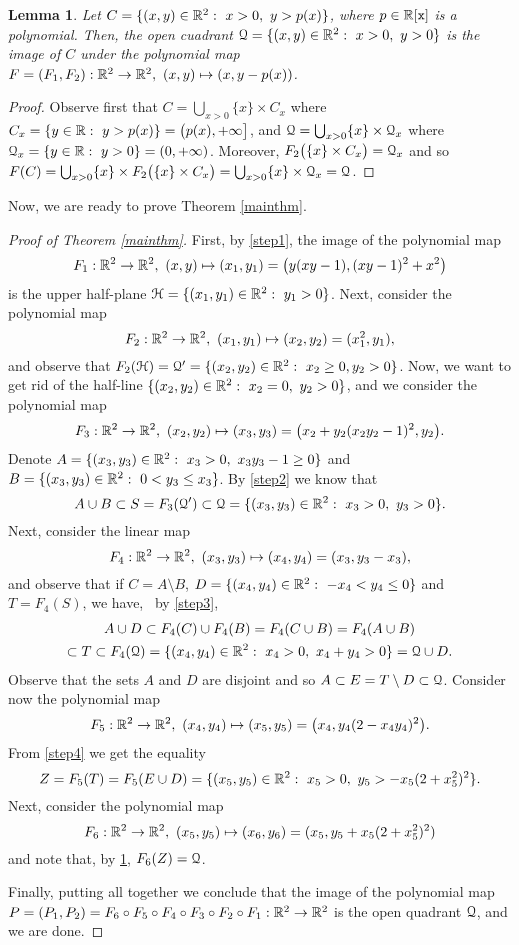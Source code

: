 \documentclass[11pt,a4paper]{amsart}
\newtheorem{lem}[theor]{Lemma}
\theoremstyle{definition}
\theoremstyle{remark}
\newcommand{\Qq}{{\EuScript Q}}
\newcommand{\halfplane}{{\EuScript H}}
\newcommand{\x}{{\tt x}} \newcommand{\y}{{\tt y}}
\begin{document}
\begin{lem}\label{step5}
Let $C=\{(x,y)\in{\mathbb R}^2:\ x>0, \ y>p(x)\}$, where $p\in\R[\x]$ is a polynomial. Then, the open cuadrant $\Qq=\{(x,y)\in\R^2:\ x>0, \ y>0\}$ is the image of $C$ under the polynomial map $F=(F_1,F_2):\R^2\to\R^2,\ (x,y)\mapsto(x,y-p(x))$.
\end{lem}
\begin{proof}
Observe first that $C=\bigcup_{x>0}\{x\}\times C_x$ where $C_x=\{y\in\R:\ y>p(x)\}=\big(p(x),+\infty\big]$, and $\Qq=\bigcup_{x>0}\{x\}\times\Qq_x$ where $\Qq_x=\{y\in\R:\ y>0\}=(0,+\infty)$. Moreover, $F_2\big(\{x\}\times C_x\big)=\Qq_x$ and so $F(C)=\bigcup_{x>0}\{x\}\times F_2\big(\{x\}\times C_x\big)=\bigcup_{x>0}\{x\}\times \Qq_x=\Qq$.
\end{proof}

Now, we are ready to prove Theorem \ref{mainthm}.

\begin{proof}[Proof of Theorem \em\ref{mainthm}]
First, by \ref{step1}, the image of the polynomial map 
$$
F_1:\R^2\to\R^2,\ (x,y)\mapsto(x_1,y_1)=\big(y(xy-1),(xy-1)^2+x^2\big)
$$ 
is the upper half-plane $\halfplane=\{(x_1,y_1)\in\R^2:\ y_1>0\}$. Next, consider the polynomial map 
$$
F_2:\R^2\to\R^2,\ (x_1,y_1)\mapsto(x_2,y_2)=(x_1^2,y_1),
$$ 
and observe that $F_2(\halfplane)=\Qq'=\{(x_2,y_2)\in\R^2:\ x_2\geq0,y_2>0\}$. Now, we want to get rid of the half-line $\{(x_2,y_2)\in\R^2:\ x_2=0,\ y_2>0\}$, and we consider the polynomial map 
$$
F_3:\R^2\to\R^2,\ (x_2,y_2)\mapsto(x_3,y_3)=\big(x_2+y_2(x_2y_2-1)^2,y_2\big).
$$
Denote $A=\{(x_3,y_3)\in\R^2:\ x_3>0,\ x_3y_3-1\geq0\}$ and $B=\{(x_3,y_3)\in{\mathbb R}^2:\ 0<y_3\leq x_3\}$. By \ref{step2} we know that 
$$
A\cup B\subset S=F_3(\Qq')\subset \Qq=\{(x_3,y_3)\in\R^2:\ x_3>0,\ y_3>0\}.
$$ 
Next, consider the linear map
$$
F_4:\R^2\to\R^2,\ (x_3,y_3)\mapsto(x_4,y_4)=(x_3,y_3-x_3),
$$
and observe that if $C=A\setminus B$, $D=\{(x_4,y_4)\in\R^2:\ -x_4<y_4\leq0\}$ and $T=F_4(S)$, we have, ~by \ref{step3}, 
\begin{multline*}
A\cup D\subset F_4(C)\cup F_4(B)=F_4(C\cup B)=F_4(A\cup B)\\
\subset T\subset F_4(\Qq)=\{(x_4,y_4)\in\R^2:\ x_4>0, \ x_4+y_4>0\}=\Qq\cup D.
\end{multline*}
Observe that the sets $A$ and $D$ are disjoint and so $A\subset E=T\setminus D\subset \Qq$. Consider now the polynomial map
$$
F_5:\R^2\to\R^2,\ (x_4,y_4)\mapsto(x_5,y_5)=\big(x_4,y_4(2-x_4y_4)^2\big).
$$
From \ref{step4} we get the equality
$$
Z=F_5(T)=F_5(E\cup D)=\{(x_5,y_5)\in\R^2:\ x_5>0,\ y_5>-x_5(2+x_5^2)^2\}.
$$
Next, consider the polynomial map
$$
F_6:\R^2\to\R^2,\ (x_5,y_5)\mapsto(x_6,y_6)=(x_5,y_5+x_5(2+x_5^2)^2)
$$
and note that, by \ref{step5}, $F_6(Z)=\Qq$. 

Finally, putting all together we conclude that the image of the polynomial map $P=(P_1,P_2)=F_6\circ F_5\circ F_4\circ F_3\circ F_2\circ F_1:{\mathbb R}^2\to{\mathbb R}^2$ is the open quadrant $\Qq$, and we are done.
\end{proof}
\end{document}

